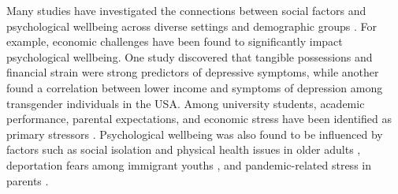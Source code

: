Many studies have investigated the connections between social factors and psychological wellbeing across diverse settings and demographic groups \cite{brydsten2018health, lecerof2015does, han2015social, reibling2017depressed, li2022suffered, groot2022impact, de2017gender, frik2023model, oguamanam2023intersectional, murnane2018personal, jung2023enjoy}. For example, economic challenges have been found to significantly impact psychological wellbeing. One study \cite{guan2022financial} discovered that tangible possessions and financial strain were strong predictors of depressive symptoms, while another \cite{katz2017self} found a correlation between lower income and symptoms of depression among transgender individuals in the USA. Among university students, academic performance, parental expectations, and economic stress have been identified as primary stressors \cite{de2016relationship, bruffaerts2018mental, lattie2020designing}. Psychological wellbeing was also found to be influenced by factors such as social isolation and physical health issues in older adults \cite{carod2017social, mccrone2008paying}, deportation fears among immigrant youths \cite{tachtler2021unaccompanied, tachtler2020supporting}, and pandemic-related stress in parents \cite{li2022suffered}.



